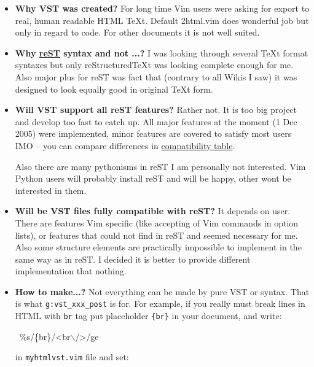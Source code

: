\documentclass[12pt]{article}
\begin{document}
\begin{itemize}
\item
\textbf{Why VST was created?} For long time Vim users were asking for export
to real, human readable HTML \TeX{}t. Default 2html.vim does wonderful job but
only in regard to code. For other documents it is not well suited.

\item
\textbf{Why \href{http://docutils.sf.net}{reST} syntax and not ...?} I was looking through several \TeX{}t format
syntaxes but only reStructured\TeX{}t was looking complete enough for me. Also
major plus for reST was fact that (contrary to all Wikis I saw) it was
designed to look equally good in original \TeX{}t form.

\item
\textbf{Will VST support all reST features?} Rather not. It is too big project
and develop too fast to catch up. All major features at the moment (1 Dec
2005) were implemented, minor features are covered to satisfy most users
IMO -- you can compare differences in \href{http://skawina.eu.org/mikolaj/restdiff.html}{compatibility table}.

 Also there are many pythonisms in reST I am personally not interested. Vim
 Python users will probably install reST and will be happy, other wont be
 interested in them.

\item
\textbf{Will be VST files fully compatible with reST?} It depends on user. There
are features Vim specific (like accepting of Vim commands in option lists),
or features that could not find in reST and seemed necessary for me. Also
some structure elements are practically impossible to implement in the same
way as in reST. I decided it is better to provide different implementation
that nothing.

\item
\textbf{How to make...?} Not everything can be made by pure VST or syntax. That
is what \texttt{g:vst\_xxx\_post} is for. For example, if you really must break
lines in HTML with \texttt{br} tag put placeholder \texttt{\{br\}} in your document,
and write:

\begin{ttfamily}\begin{flushleft}
\mbox{~\%s/\{br\}/<br$\backslash$/>/ge}\\
\end{flushleft}\end{ttfamily}

 in \texttt{myhtmlvst.vim} file and set:


\end{itemize}
\end{document}
